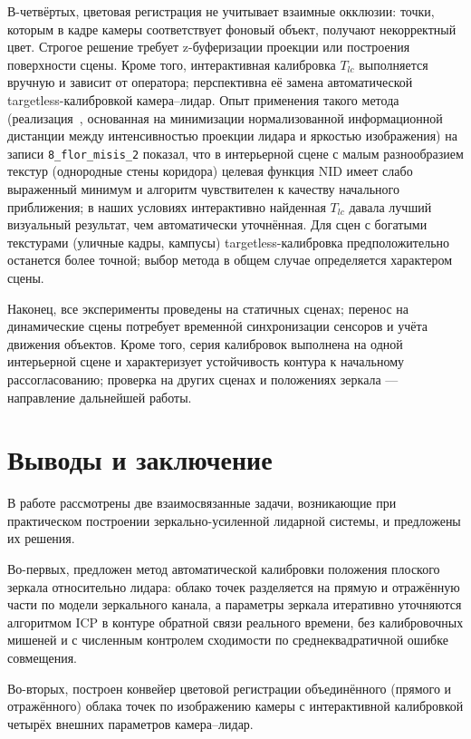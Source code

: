\documentclass{misisarticle}
\begin{document}
В-четвёртых, цветовая регистрация не учитывает взаимные окклюзии:
точки, которым в кадре камеры соответствует фоновый объект, получают
некорректный цвет. Строгое решение требует z-буферизации проекции или
построения поверхности сцены. Кроме того, интерактивная калибровка
$T_{lc}$ выполняется вручную и зависит от оператора; перспективна её
замена автоматической targetless-калибровкой камера--лидар. Опыт
применения такого метода (реализация~\cite{Koide2023GeneralCalib},
основанная на минимизации нормализованной информационной дистанции
между интенсивностью проекции лидара и яркостью изображения) на
записи \texttt{8\_flor\_misis\_2} показал, что в интерьерной сцене с
малым разнообразием текстур (однородные стены коридора) целевая
функция NID имеет слабо выраженный минимум и алгоритм чувствителен к
качеству начального приближения; в наших условиях интерактивно
найденная $T_{lc}$ давала лучший визуальный результат, чем
автоматически уточнённая. Для сцен с богатыми текстурами (уличные
кадры, кампусы) targetless-калибровка предположительно останется
более точной; выбор метода в общем случае определяется характером
сцены.

Наконец, все эксперименты проведены на статичных сценах; перенос на
динамические сцены потребует временн\'{о}й синхронизации сенсоров и
учёта движения объектов. Кроме того, серия калибровок выполнена на
одной интерьерной сцене и характеризует устойчивость контура к
начальному рассогласованию; проверка на других сценах и положениях
зеркала --- направление дальнейшей работы.

\section{Выводы и заключение}

В работе рассмотрены две взаимосвязанные задачи, возникающие при
практическом построении зеркально-усиленной лидарной системы, и
предложены их решения.

Во-первых, предложен метод автоматической калибровки положения плоского
зеркала относительно лидара: облако точек разделяется на прямую и
отражённую части по модели зеркального канала, а параметры зеркала
итеративно уточняются алгоритмом ICP в контуре обратной связи
реального времени, без калибровочных мишеней и с численным контролем
сходимости по среднеквадратичной ошибке совмещения.

Во-вторых, построен конвейер цветовой регистрации объединённого
(прямого и отражённого) облака точек по изображению камеры с
интерактивной калибровкой четырёх внешних параметров камера--лидар.
\end{document}
